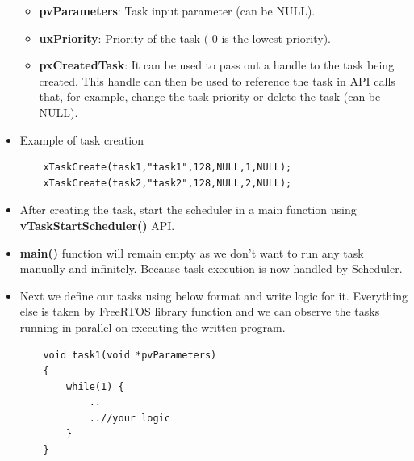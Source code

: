 \begin{itemize}
\begin{itemize}
        \item \textbf{pvParameters}: Task input parameter (can be NULL).
        \item \textbf{uxPriority}: Priority of the task ( 0 is the lowest priority).
        \item \textbf{pxCreatedTask}: It can be used to pass out a handle to the task being created. This handle can then be used to reference the task in API calls that, for example, change the task priority or delete the task (can be NULL).
    \end{itemize}
    \item Example of task creation
    \begin{lstlisting}
    xTaskCreate(task1,"task1",128,NULL,1,NULL);
    xTaskCreate(task2,"task2",128,NULL,2,NULL);  
    \end{lstlisting}
    \item After creating the task, start the scheduler in a main function using \textbf{vTaskStartScheduler()} API.
    \item \textbf{main()} function will remain empty as we don’t want to run any task manually and infinitely. Because task execution is now handled by Scheduler.
    \item Next we define our tasks using below format and write logic for it. Everything else is taken by FreeRTOS library function and we can observe the tasks running in parallel on executing the written program.
    \begin{lstlisting}
    void task1(void *pvParameters)  
    {
        while(1) {
            ..
            ..//your logic
        }
    }
    \end{lstlisting}
\end{itemize}
\newpage






